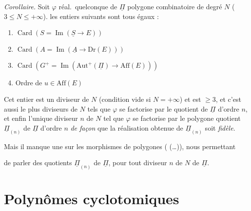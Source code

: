 \documentclass[11pt,a4paper]{article}
\begin{document}
\emph{Corollaire.} Soit $\varphi$ réal.\ quelconque de $\underline{\Pi}$ polygone combinatoire de degré $N$ ($3 \leq N \leq +\infty$).   les entiers suivants sont tous égaux :
\begin{enumerate}
  \item[1)] $\operatorname{Card}(S = \operatorname{Im}(\underline{S} \to E))$
  \item[2)] $\operatorname{Card}(A = \operatorname{Im}(\underline{A} \to \mathrm{Dr}(E)))$
  \item[3)] $\operatorname{Card}(G^+ = \operatorname{Im}(\mathrm{Aut}^+(\underline{\Pi}) \to \mathrm{Aff}(E)))$
  \item[4)] Ordre de \struck{\ill{}} $u \in \mathrm{Aff}(E)$
\end{enumerate}
\struck{\ill{}} Cet entier  est  un diviseur de $N$ (condition vide si $N = +\infty$) et est $\geq 3$, et c'est aussi le plus   diviseurs  de $N$ tels que $\varphi$ se factorise par le  quotient  de $\underline{\Pi}$ d'ordre $n$, et enfin l'unique diviseur $n$ de $N$ tel que $\varphi$ se factorise par le polygone quotient $\underline{\Pi}_{(n)}$ de $\underline{\Pi}$ d'ordre $n$ \emph{de façon} que la réalisation obtenue de $\underline{\Pi}_{(n)}$ soit \emph{fidèle}.

 Mais il manque une \ill{}  sur les morphismes  de polygones  (  \ill{} (…)), nous permettant

de parler des quotients $\underline{\Pi}_{(n)}$ de $\underline{\Pi}$, pour tout diviseur $n$ de  $N$ de $\underline{\Pi}$.


\section{Polynômes cyclotomiques}
\end{document}
